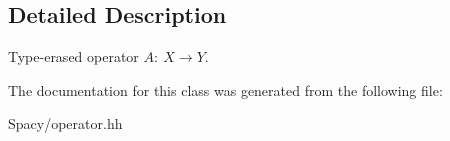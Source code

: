 \subsection{Detailed Description}
Type-\/erased operator $A:\ X \to Y $. 

The documentation for this class was generated from the following file\+:\begin{DoxyCompactItemize}
\item 
Spacy/operator.\+hh\end{DoxyCompactItemize}

